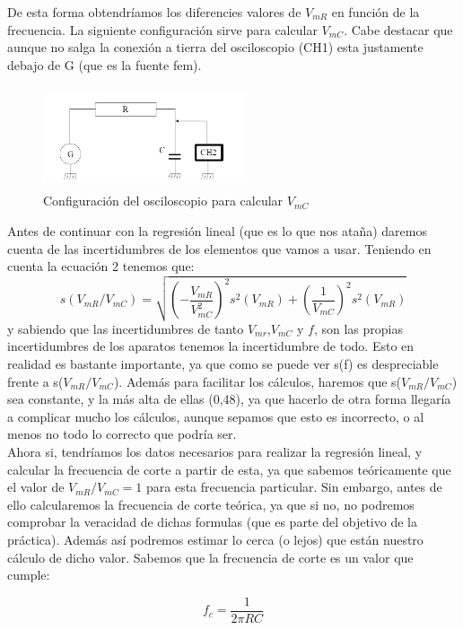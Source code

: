 \documentclass[10pt,a4paper]{article}
\begin{document}
De esta forma obtendríamos los diferencies valores de $V_{mR}$ en función de la frecuencia. La siguiente configuración sirve para calcular $V_{mC}$. Cabe destacar que aunque no salga la conexión a tierra del osciloscopio (CH1) esta justamente debajo de G (que es la fuente fem).

\begin{figure}[htb] %
\centering
\includegraphics[width=6cm, height=3cm]{Osciloscopio 2}
\caption{Configuración del osciloscopio para calcular $V_{mC}$ }
\label{fig: Osciloscopio 2}
\end{figure}
Antes de continuar con la regresión lineal (que es lo que nos ataña) daremos cuenta de las incertidumbres de los elementos que vamos a usar. Teniendo en cuenta la ecuación 2 tenemos que: 
\begin{equation}
s(V_{mR}/V_{mC})=\sqrt{(-\dfrac{V_{mR}}{V_{mC}^2})^2 s^2(V_{mR}) + (\dfrac{1}{V_{mC}})^2s^2(V_{mR})}
\end{equation}
y sabiendo que las incertidumbres de tanto $V_{mr}$,$V_{mC}$ y $f$,  son las propias incertidumbres de los aparatos tenemos la incertidumbre de todo. Esto en realidad es bastante importante, ya que como se puede ver s(f) es despreciable frente a s($V_{mR} / V_{mC}$). Además para facilitar los cálculos, haremos que s($V_{mR} / V_{mC}$) sea constante, y la más alta de ellas (0,48), ya que hacerlo de otra forma llegaría a complicar mucho los cálculos, aunque sepamos que esto es incorrecto, o al menos no todo lo correcto que podría ser. \\


Ahora si, tendríamos los datos necesarios para realizar la regresión lineal, y calcular la frecuencia de corte a partir de esta, ya que sabemos teóricamente que el valor de $V_{mR}/V_{mC}=1$ para esta frecuencia particular. Sin embargo, antes de ello calcularemos la frecuencia de corte teórica, ya que si no, no podremos comprobar la veracidad de dichas formulas (que es parte del objetivo de la práctica). Además así podremos estimar lo cerca (o lejos) que están nuestro cálculo de dicho valor. Sabemos que la frecuencia de corte es un valor que cumple:

\begin{equation}
\label{Frecuencia de corte teoría}
f_c=\dfrac{1}{2 \pi R C}
\end{equation}
\end{document}
